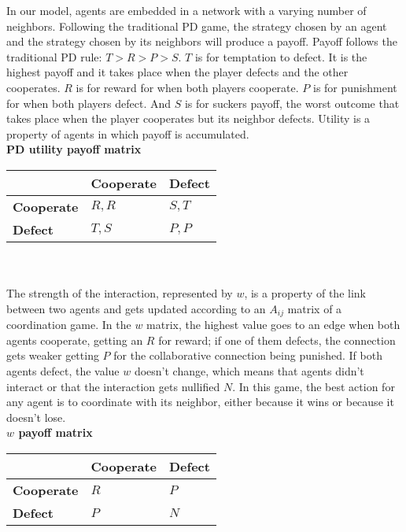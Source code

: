 \documentclass{bmcart}
\begin{document}
In our model, agents are embedded in a network with a varying number of
neighbors. Following the traditional PD game, the strategy chosen by an agent
and the strategy chosen by its neighbors will produce a payoff. Payoff follows
the traditional PD rule: $T > R > P > S$. $T$ is for temptation to defect. It is the highest
payoff and it takes place when the player defects and the other cooperates. $R$
is for reward for when both players cooperate. $P$ is for punishment for when
both players defect. And $S$ is for suckers payoff, the worst outcome that
takes place when the player cooperates but its neighbor defects. Utility is a
property of agents in which payoff is accumulated.\\   

{\bf PD utility payoff matrix}\\

\begin{tabular}{| l | l | l |}
\hline
          & \bf{Cooperate} & \bf{Defect} \\ \hline
\bf{Cooperate} &  $R,R$      &  $S,T$   \\ \hline
\bf{Defect}    &  $T,S$      &  $P,P$   \\ \hline

\end{tabular}\\ \\

The strength of the interaction, represented by $w$, is a property of the link between two agents and
gets updated according to an $A_{ij}$ matrix of a coordination game. In the $w$ matrix, the highest value
goes to an edge when both agents cooperate, getting an $R$ for reward; if one of
them defects, the connection gets weaker getting $P$ for the collaborative
connection being punished. If both agents defect, the value $w$ doesn't change,
which means that agents didn't interact or that the interaction gets nullified
$N$. In this game, the best action for any agent is to coordinate with its
neighbor, either because it wins or because it doesn't lose. \\ 

{\bf $w$ payoff matrix}\\

\begin{tabular}{| l | l | l |}
\hline
          & \bf{Cooperate} & \bf{Defect} \\ \hline
\bf{Cooperate} &  $R$      &  $P$   \\ \hline
\bf{Defect}    &  $P$      &  $N$   \\ \hline

\end{tabular}\\ \\
\end{document}
